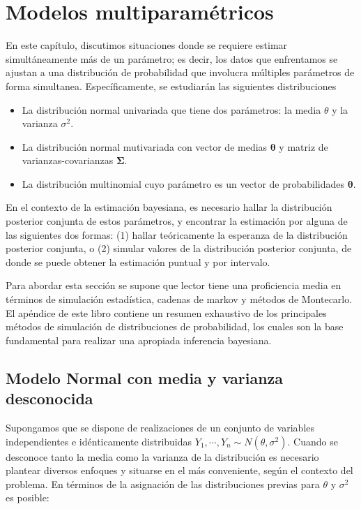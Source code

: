 \documentclass[
  10pt,
  spanish,
]{book}
\providecommand{\tightlist}{%
  \setlength{\itemsep}{0pt}\setlength{\parskip}{0pt}}
\theoremstyle{definition}
\theoremstyle{definition}
\theoremstyle{definition}
\theoremstyle{definition}
\theoremstyle{remark}
\begin{document}
\hypertarget{modelos-multiparamuxe9tricos}{%
\chapter{Modelos multiparamétricos}\label{modelos-multiparamuxe9tricos}}

En este capítulo, discutimos situaciones donde se requiere estimar simultáneamente más de un parámetro; es decir, los datos que enfrentamos se ajustan a una distribución de probabilidad que involucra múltiples parámetros de forma simultanea. Específicamente, se estudiarán las siguientes distribuciones

\begin{itemize}
\tightlist
\item
  La distribución normal univariada que tiene dos parámetros: la media \(\theta\) y la varianza \(\sigma^2\).
\item
  La distribución normal mutivariada con vector de medias \(\boldsymbol \theta\) y matriz de varianzas-covarianzas \(\boldsymbol \Sigma\).
\item
  La distribución multinomial cuyo parámetro es un vector de probabilidades \(\boldsymbol \theta\).
\end{itemize}

En el contexto de la estimación bayesiana, es necesario hallar la distribución posterior conjunta de estos parámetros, y encontrar la estimación por alguna de las siguientes dos formas: (1) hallar teóricamente la esperanza de la distribución posterior conjunta, o (2) simular valores de la distribución posterior conjunta, de donde se puede obtener la estimación puntual y por intervalo.

Para abordar esta sección se supone que lector tiene una proficiencia media en términos de simulación estadística, cadenas de markov y métodos de Montecarlo. El apéndice de este libro contiene un resumen exhaustivo de los principales métodos de simulación de distribuciones de probabilidad, los cuales son la base fundamental para realizar una apropiada inferencia bayesiana.

\hypertarget{modelo-normal-con-media-y-varianza-desconocida}{%
\section{Modelo Normal con media y varianza desconocida}\label{modelo-normal-con-media-y-varianza-desconocida}}

Supongamos que se dispone de realizaciones de un conjunto de variables independientes e idénticamente distribuidas \(Y_1,\cdots,Y_n\sim N(\theta,\sigma^2)\). Cuando se desconoce tanto la media como la varianza de la distribución es necesario plantear diversos enfoques y situarse en el más conveniente, según el contexto del problema. En términos de la asignación de las distribuciones previas para \(\theta\) y \(\sigma^2\) es posible:
\end{document}
